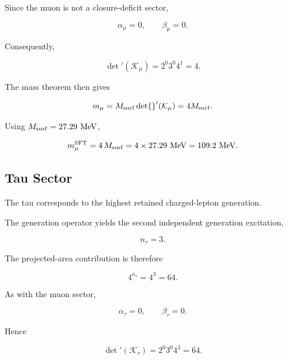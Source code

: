 \documentclass[11pt]{article}
\theoremstyle{definition}
\theoremstyle{remark}
\begin{document}
Since the muon is not a closure-deficit sector,

\begin{equation}
\alpha_\mu = 0,
\qquad
\beta_\mu = 0.
\end{equation}

Consequently,

\begin{equation}
\det{}'(\mathcal K_\mu) =
2^{0}
3^{0}
4^{1} =
4.
\end{equation}

The mass theorem then gives

\begin{equation}
m_\mu =
M_{\rm surf}
\det{}'(\mathcal K_\mu) = 
4M_{\rm surf}.
\end{equation}

Using
\(M_{\rm surf}=27.29~{\rm MeV}\),

\begin{equation}
m_\mu^{\rm SFT}
=
4\,M_{\rm surf}
=
4\times 27.29~{\rm MeV}
=
109.2~{\rm MeV}.
\label{eq:muon_mass_sft}
\end{equation}


\subsection{Tau Sector}
\label{subsec:tau_sector}

The tau corresponds to the highest retained charged-lepton
generation.

The generation operator yields the second independent
generation excitation,

\begin{equation}
n_\tau = 3.
\end{equation}

The projected-area contribution is therefore

\begin{equation}
4^{n_\tau} = 4^3 = 64.
\end{equation}

As with the muon sector,

\begin{equation}
\alpha_\tau = 0,
\qquad
\beta_\tau = 0.
\end{equation}

Hence

\begin{equation}
\det{}'(\mathcal K_\tau) = 
2^{0}
3^{0}
4^{3} = 64.
\end{equation}
\end{document}
